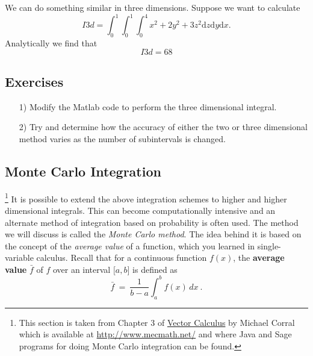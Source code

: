 We can do something similar in three dimensions. Suppose we want to calculate
$$I3d=\int_0^1\int_0^1\int_0^4 x^2+2y^2+3z^2\mathrm{d}z\mathrm{d}y\mathrm{d}x.$$
Analytically we find that
$$I3d=68$$
\subsection{Exercises}
\begin{enumerate}
\item[1)] Modify the Matlab code to perform the three dimensional integral.
\item[2)] Try and determine how the accuracy of either the two or three dimensional method varies as the number of subintervals is changed.
\end{enumerate}

\subsection{Monte Carlo Integration}

\footnote{This section is taken from Chapter 3 of \underline{Vector Calculus} by Michael Corral which is available at \url{http://www.mecmath.net/} and where Java and Sage programs for doing Monte Carlo integration can be found.} It is possible to extend the above integration schemes to higher and higher dimensional integrals. This can become computationally intensive and an alternate method of integration based on probability is often used. The method we will discuss is called the \emph{Monte Carlo method}. The idea behind it is based on the concept of the \emph{average value} of a function, which you learned in single-variable calculus. Recall that for a continuous function $f(x)$, the \textbf{average value} $\bar{f}$ of $f$ over an interval $\lbrack a,b \rbrack$ is defined as 
\begin{equation}\label{eqn:favg}
 \bar{f} ~=~ \frac{1}{b-a}\int_a^b f(x)\,dx ~.
\end{equation}

